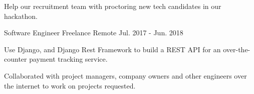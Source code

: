\begin{cventries}
{\begin{cvitems}
        \item {Help our recruitment team with proctoring new tech candidates in our hackathon.}
      \end{cvitems}
    }
  \cventry
    {Software Engineer} %
    {Freelance} %
    {Remote} %
    {Jul. 2017 - Jun. 2018} %
    {
      \begin{cvitems} %
        \item {Use Django, and Django Rest Framework to build a REST API for an over-the-counter payment tracking service.}
        \item {Collaborated with project managers, company owners and other engineers over the internet to work on projects requested.}
      \end{cvitems}
    }
\end{cventries}
